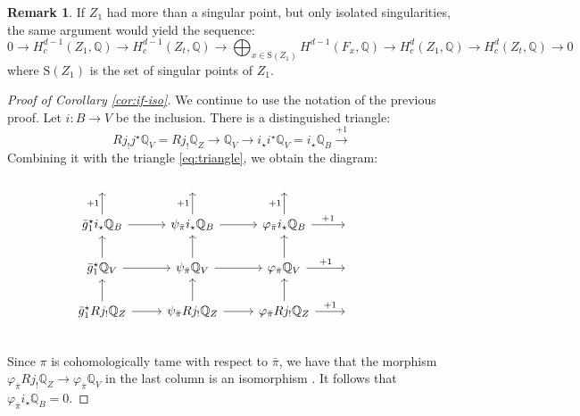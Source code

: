 \documentclass[11pt, reqno]{amsart}
\theoremstyle{plain}
\theoremstyle{definition}
\newtheorem{rem}[thm]{Remark}
\newcommand{\QQ}{\mathbb{Q}}
\begin{document}
\begin{rem}
\label{rem:more-ODPs} If $Z_1$ had more than a singular point, but only isolated singularities, the same argument would yield the sequence:
\[ 
0 \to H^{d-1}_c(Z_1, \QQ) \to H^{d-1}_c(Z_t, \QQ) \to \bigoplus_{x \in \mathrm{S}(Z_1) } H^{d-1}(F_x, \QQ) \to H^d_c(Z_1, \QQ) \to H^d_c(Z_t, \QQ) \to 0
\] where $\mathrm{S}(Z_1)$ is the set of singular points of $Z_1$. 
\end{rem}

\begin{proof}[Proof of Corollary \ref{cor:if-iso}]
We continue to use the notation of the previous proof. 
Let $i \colon B \to V$ be the inclusion. There is a distinguished triangle:
\begin{equation}
\label{eq:B-triangle}
Rj_{!}  j^\star \QQ_V = Rj_{!}  \QQ_Z \xrightarrow{} \QQ_V \xrightarrow{} i_\star i^\star \QQ_V= i_\star \QQ_B \xrightarrow{+1}	
\end{equation}
Combining it with the triangle \eqref{eq:triangle}, we obtain the diagram: 
\begin{equation}
    \label{eq:diagram-triangles}
\begin{tikzcd}
\textcolor{white}{---} & \textcolor{white}{---} & \textcolor{white}{---}& \textcolor{white}{---}\\
{\bar{g}_1}^\star i_\star \QQ_B \rar{}  \uar{+1}  &    \psi_{\bar{\pi}} i_\star \QQ_B  \rar{} \uar{+1} & \varphi_{\bar{\pi}}  i_\star \QQ_B \rar{+1}  \uar{+1} & \textcolor{white}{---}\\
{\bar{g}_1}^\star \QQ_V  \rar{}  \uar{} &   \psi_{\bar{\pi}} \QQ_V \rar{} \uar{} & \varphi_{\bar{\pi}} \QQ_V \rar{+1}  \uar{}  & \textcolor{white}{---} \\
{\bar{g}_1}^\star Rj_{!}  \QQ_Z  \rar{}   \uar{}& \psi_{\bar{\pi}} Rj_{!}  \QQ_Z  \rar{} \uar{ }& \varphi_{\bar{\pi}} Rj_{!}  \QQ_Z \rar{+1} \uar{} & \textcolor{white}{---} \\
\end{tikzcd}
\end{equation}
Since $\pi$ is cohomologically tame with respect to $\bar{\pi}$, we have that the morphism $\varphi_{\bar{\pi}} Rj_{!}\QQ_Z  \to \varphi_{\bar{\pi}} \QQ_V$ in the last column is an isomorphism 
\cite[Theorem 6.2.15]{Dimca}. It follows that 
$\varphi_{\bar{\pi}}  i_\star \QQ_B =0$. 


\end{proof}
\end{document}
